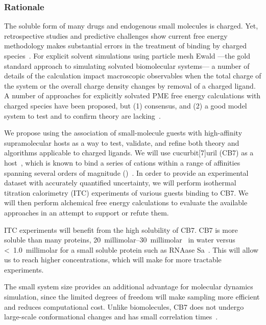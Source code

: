 \documentclass[10pt,final]{article}
\begin{document}
\subsubsection*{Rationale}
The soluble form of many drugs and endogenous small molecules is charged. Yet, retrospective studies and predictive challenges show current free energy methodology makes substantial errors in the treatment of binding by charged species~\autocite{Rocklin2013b,Muddana2014a}.
%
For explicit solvent simulations using particle mesh Ewald ---the gold standard approach to simulating solvated biomolecular systems--- a number of details of the calculation impact macroscopic observables when the total charge of the system or the overall charge density changes by removal of a charged ligand.
%
A number of approaches for explicitly solvated PME free energy calculations with charged species have been proposed, but (1) consensus, and (2) a good model system to test and to confirm theory are lacking~\autocite{Reif2013a, Rocklin2013a, Lin2014a}.

We propose using the association of small-molecule guests with high-affinity supramolecular hosts as a way to test, validate, and refine both theory and algorithms applicable to charged ligands.
%
We will use cucurbit[7]uril (CB7) as a host~\autocite{Lagona2005a}, which is known to bind a series of cations within a range of affinities spanning several orders of magnitude ()~\autocite{Cao2013a}.
%
In order to provide an experimental dataset with accurately quantified uncertainty, we will perform isothermal titration calorimetry (ITC) experiments of various guests binding to CB7.
%
We will then perform alchemical free energy calculations to evaluate the available approaches in an attempt to support or refute them.

%
ITC experiments will benefit from the high solubility of CB7.
%
CB7 is more soluble than many proteins, \SIrange[scientific-notation=false]{20}{30}{millimolar}~\autocite{Lagona2005a} in water versus \textless~\SI{1.0}{millimolar} for a small soluble protein such as RNAase Sa~\autocite{Pace2004a}.
%
This will allow us to reach higher concentrations, which will make for more tractable experiments.

The small system size provides an additional advantage for molecular dynamics simulation, since the limited degrees of freedom will make sampling more efficient and reduces computational cost.
%
Unlike biomolecules, CB7 does not undergo large-scale conformational changes and has small correlation times~\autocite{Mock1989a,Tang2011a}.
\end{document}
